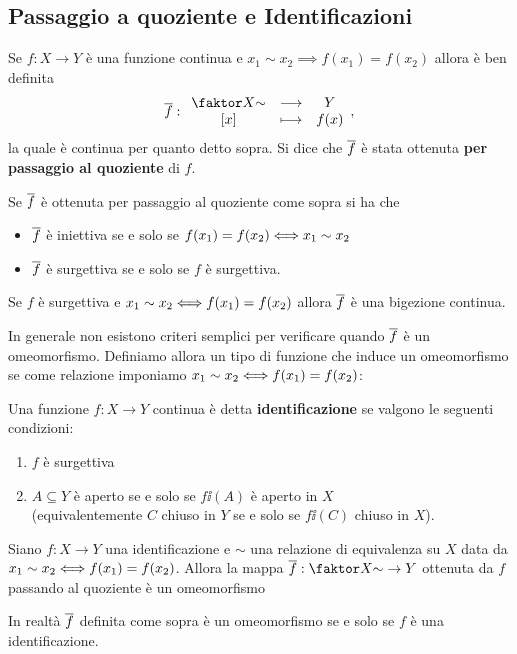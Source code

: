 \begin{multicols*}{2}
\subsection{Passaggio a quoziente e Identificazioni}
\begin{definition}
Se $f:X\to Y$ è una funzione continua e $x_1\sim x_2\implies f(x_1)=f(x_2)$ allora è ben definita
\[\ol f:\funcDef{\quot X\sim}{Y}{[x]}{f(x)},\]
la quale è continua per quanto detto sopra. Si dice che  $\overline{f}$ è stata ottenuta \textbf{per passaggio al quoziente} di $f$.
\end{definition}

\begin{proposition}\label{MappeIndotteAlQuozienteIniettiveSurgettive}
Se $\overline{f}$ è ottenuta per passaggio al quoziente come sopra si ha che
\begin{itemize}[noitemsep]
\item $\overline{f}$ è iniettiva se e solo se $f(x_1)=f(x_2)\Longleftrightarrow x_1\sim x_2$
\item $\overline{f}$ è surgettiva se e solo se $f$ è surgettiva.
\end{itemize}
\end{proposition}
\begin{remark}
Se $f$ è surgettiva e $x_1\sim x_2\Longleftrightarrow f(x_1)=f(x_2)$ allora $\overline{f}$ è una bigezione continua.
\end{remark}
\noindent In generale non esistono criteri semplici per verificare quando $\overline{f}$ è un omeomorfismo. Definiamo allora un tipo di funzione che induce un omeomorfismo se come relazione imponiamo $x_1\sim x_2\Longleftrightarrow f(x_1)=f(x_2)$:

\begin{definition}[Identificazione]
Una funzione $f:X\to Y$ continua è detta \textbf{identificazione} se valgono le seguenti condizioni:
\begin{enumerate}[noitemsep]
\item $f$ è surgettiva
\item $A\subseteq Y$ è aperto se e solo se $f\ii(A)$ è aperto in $X$ \\(equivalentemente $C$ chiuso in $Y$ se e solo se $f\ii(C)$ chiuso in $X$).
\end{enumerate}
\end{definition}

\begin{theorem}\label{IdentificazioniInduconoOmeomorfismiSulQuoziente}
Siano $f:X\to Y$ una identificazione e $\sim $ una relazione di equivalenza su $X$ data da $x_1\sim x_2\Longleftrightarrow f(x_1)=f(x_2)$. Allora la mappa $\ol f:\quot X\sim \to Y$ ottenuta da $f$ passando al quoziente è un omeomorfismo
\end{theorem}
\begin{remark}
In realtà $\overline{f}$ definita come sopra è un omeomorfismo se e solo se $f$ \`e una identificazione.
\end{remark}


\end{multicols*}
